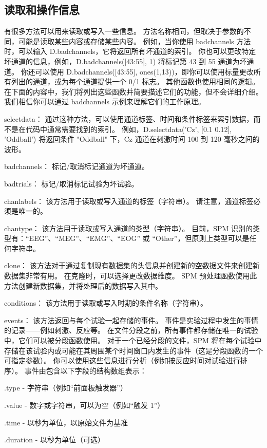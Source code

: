 \subsection{读取和操作信息}

有很多方法可以用来读取或写入一些信息。
方法名称相同，但取决于参数的不同，可能是读取某些内容或存储某些内容。
例如，当你使用 badchannels 方法时，可以输入 D.badchannels，它将返回所有坏通道的索引。
你也可以更改特定坏通道的信息，例如，D.badchannels([43:55], 1) 将标记第 43 到 55 通道为坏通道。
你还可以使用 D.badchannels([43:55], ones(1,13))，即你可以使用标量更改所有列出的通道，或为每个通道提供一个 0/1 标志。
其他函数也使用相同的逻辑。
在下面的内容中，我们将列出这些函数并简要描述它们的功能，但不会详细介绍。
我们相信你可以通过 badchannels 示例来理解它们的工作原理。


selectdata：
通过这种方法，可以使用通道标签、时间和条件标签来索引数据，而不是在代码中通常需要找到的索引。
例如，D.selectdata('Cz', [0.1 0.12], 'Oddball') 将返回条件 "Oddball" 下，Cz 通道在刺激时间 100 到 120 毫秒之间的波形。

badchannels：
标记/取消标记通道为坏通道。

badtrials：
标记/取消标记试验为坏试验。

chanlabels：
该方法用于读取或写入通道的标签（字符串）。
请注意，通道标签必须是唯一的。

chantype：
该方法用于读取或写入通道的类型（字符串）。
目前，SPM 识别的类型有：“EEG”、“MEG”、“EMG”、“EOG” 或 “Other”，但原则上类型可以是任何字符串。

clone：
该方法对于通过复制现有数据集的头信息并创建新的空数据文件来创建新数据集非常有用。
在克隆时，可以选择更改数据维度。
SPM 预处理函数使用此方法创建新数据集，并将处理后的数据写入其中。

conditions：
该方法用于读取或写入时期的条件名称（字符串）。

events：
该方法返回与每个试验一起存储的事件。
事件是实验过程中发生的事情的记录——例如刺激、反应等。
在文件分段之前，所有事件都存储在唯一的试验中，它们可以被分段函数使用。
对于一个已经分段的文件，SPM 将在每个试验中存储在该试验内或可能在其周围某个时间窗口内发生的事件（这是分段函数的一个可指定参数）。
你可以使用这些信息进行分析（例如按反应时间对试验进行排序）。
事件由包含以下字段的结构数组表示：

.type - 字符串（例如“前面板触发器”）

.value - 数字或字符串，可以为空（例如“触发 1”）

.time - 以秒为单位，以原始文件为基准

.duration - 以秒为单位（可选）

